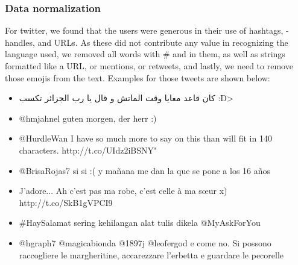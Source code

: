 \documentclass[11pt]{article}
\begin{document}
\subsubsection{Data normalization}
For twitter, we found that the users were generous in their
use of hashtags, -handles, and URLs. As these did not contribute any value in recognizing the language used, we removed all words with \# and in them, as well as strings
formatted like a URL, or mentions, or retweets, and lastly, we need to remove those emojis from the text. Examples for those tweets are shown below:
\begin{itemize}
\item \< كان قاعد معايا وقت الماتش و قال يا رب الجزائر تكسب :D>
\item @hmjahnel guten morgen, der herr :)   

\item @HurdleWan I have so much more to say on this than will fit in 140 characters. http://t.co/UIdz2iBSNY"  

\item @BrisaRojas7 si si :( y mañana me dan la que se pone a los 16 años 

\item J'adore... Ah c'est pas ma robe, c'est celle à ma sœur x) http://t.co/SkB1gVPCI9 

\item \#HaySalamat sering kehilangan alat tulis dikela @MyAskForYou

\item @hgraph7 @magicabionda @1897j @leofergod e come no. Si possono raccogliere le margheritine, accarezzare l'erbetta e guardare le pecorelle


\end{itemize}
\end{document}
